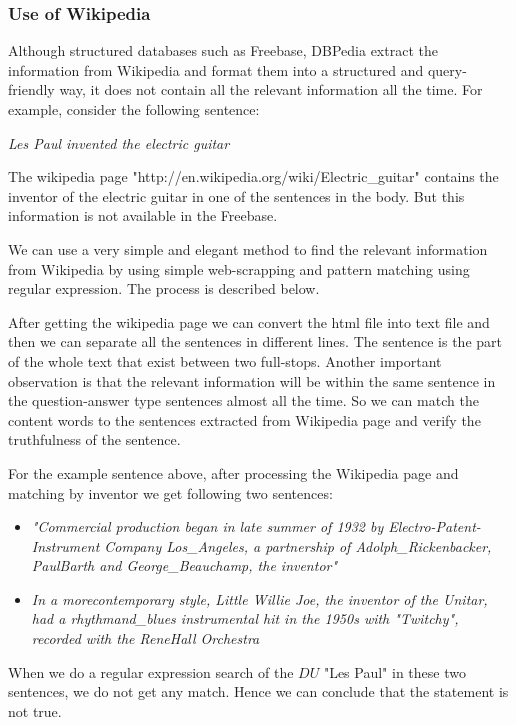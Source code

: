 \documentclass[11pt]{article}
\begin{document}
\subsubsection{Use of Wikipedia}
\label{sec:UseOfWikipedia}
Although structured databases such as Freebase, DBPedia extract the information from Wikipedia and format them into a structured and query-friendly way, it does not contain all the relevant information all the time. For example, consider the following sentence:

\emph{Les Paul invented the electric guitar}

The wikipedia page "http://en.wikipedia.org/wiki/Electric\_guitar" contains the inventor of the electric guitar in one of the sentences in the body. But this information is not available in the Freebase. 

We can use a very simple and elegant method to find the relevant information from Wikipedia by using simple web-scrapping and pattern matching using regular expression. The process is described below.

After getting the wikipedia page we can convert the html file into text file and then we can separate all the sentences in different lines. The sentence is the part of the whole text that exist between two full-stops. Another important observation is that the relevant information will be within the same sentence in the question-answer type sentences almost all the time. So we can match the content words to the sentences extracted from Wikipedia page and verify the truthfulness of the sentence. 

For the example sentence above, after processing the Wikipedia page and matching by inventor we get following two sentences:
\begin {itemize}
\item \emph{"Commercial production began in late summer of 1932 by Electro-Patent-Instrument Company Los\_Angeles, a partnership of Adolph\_Rickenbacker, PaulBarth and George\_Beauchamp, the inventor"}

\item \emph{In a morecontemporary style, Little Willie Joe, the inventor of the Unitar, had a rhythmand\_blues instrumental hit in the 1950s with "Twitchy", recorded with the ReneHall Orchestra}
\end{itemize}

When we do a regular expression search of the $DU$ "Les Paul" in these two sentences, we do not get any match. Hence we can conclude that the statement is not true. 
 
\end{document}
